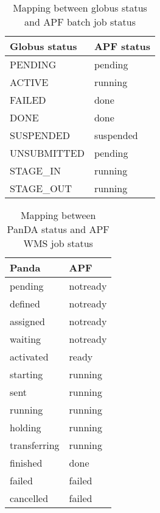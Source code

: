 \documentclass[a4paper]{jpconf}
\begin{document}
\begin{table}
   \begin{center}
      \begin{tabular}{l l}
         \hline
         \textbf{Globus status}   & \textbf{APF status}       \\ 
         \hline
         PENDING       &   pending    \\
         ACTIVE        &   running    \\
         FAILED        &   done       \\
         DONE          &   done       \\
         SUSPENDED     &   suspended  \\
         UNSUBMITTED   &   pending    \\
         STAGE\_IN     &   running    \\
         STAGE\_OUT    &   running    \\
         \hline
      \end{tabular}
   \end{center}
   \caption{Mapping between globus status and APF batch job status}
   \label{translation}
\end{table}



\begin{table}
   \begin{center}
      \begin{tabular}{l l}
         \hline
         \textbf{Panda}         & \textbf{APF}       \\
         \hline
         pending       & notready  \\ 
         defined       & notready  \\ 
         assigned      & notready  \\ 
         waiting       & notready  \\ 
         activated     & ready     \\ 
         starting      & running   \\ 
         sent          & running   \\ 
         running       & running   \\ 
         holding       & running   \\ 
         transferring  & running   \\ 
         finished      & done      \\ 
         failed        & failed    \\ 
         cancelled     & failed    \\ 
         \hline
      \end{tabular}
   \end{center}
   \caption{Mapping between PanDA status and APF WMS job status}
   \label{translation}
\end{table}
\end{document}
